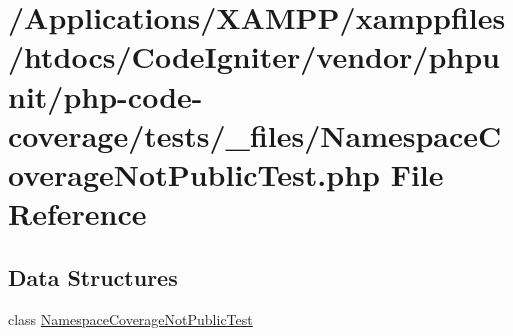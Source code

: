 \hypertarget{php-code-coverage_2tests_2__files_2_namespace_coverage_not_public_test_8php}{}\section{/\+Applications/\+X\+A\+M\+P\+P/xamppfiles/htdocs/\+Code\+Igniter/vendor/phpunit/php-\/code-\/coverage/tests/\+\_\+files/\+Namespace\+Coverage\+Not\+Public\+Test.php File Reference}
\label{php-code-coverage_2tests_2__files_2_namespace_coverage_not_public_test_8php}
\subsection*{Data Structures}
\begin{DoxyCompactItemize}
\item 
class \mbox{\hyperlink{class_namespace_coverage_not_public_test}{Namespace\+Coverage\+Not\+Public\+Test}}
\end{DoxyCompactItemize}

